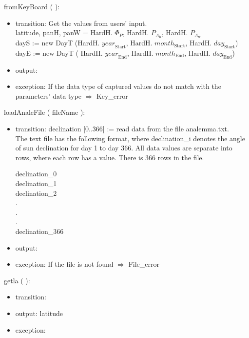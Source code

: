 \documentclass[12pt, titlepage]{article}
\begin{document}
\noindent  fromKeyBoard ( ):
\begin{itemize}
\item transition: Get the values from users' input.\\
latitude, panH, panW = HardH. $\Phi_P$, HardH. $P_{A_{\text{h}}}$, HardH. $P_{A_{\text{w}}}$\\

dayS := new DayT (HardH. $\mathit{year}_\text{Start}$, HardH. $\mathit{month}_\text{Start}$, HardH. $\mathit{day}_\text{Start}$) \\

dayE :=  new DayT ( HardH. $\mathit{year}_\text{End}$, HardH. $\mathit{month}_\text{End}$, HardH. $\mathit{day}_\text{End}$)\\
\item output:
\item exception: If the data type of captured values do not match with the parameters' data type $\Rightarrow$ Key\_error
\end{itemize}



\noindent  loadAnaleFile ( fileName ):
\begin{itemize}
\item transition: declination [0..366] := read data from the file analemma.txt.\\
The text file has the following format, where declination\_i denotes the angle of sun declination for day 1 to day 366.
All data values are separate into rows, where each row has a value. There is 366 rows in the file.
\begin{center}
declination\_0\\
declination\_1\\
declination\_2\\
.\\
.\\
.\\
declination\_366\\
\end{center}

\item output:
\item exception: If the file is not found $\Rightarrow$ File\_error
\end{itemize}

\noindent  getla ( ):
\begin{itemize}
\item transition: 
\item output: latitude
\item exception: 
\end{itemize}
\end{document}
